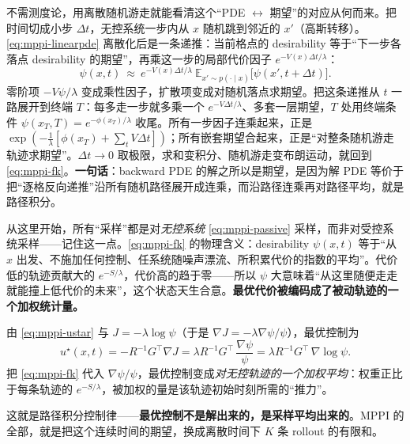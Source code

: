 \begin{derivation}
\label{der:mppi-fk}
不需测度论，用离散随机游走就能看清这个“PDE $\leftrightarrow$ 期望”的对应从何而来。把时间切成小步 $\Delta t$，无控系统一步内从 $x$ 随机跳到邻近的 $x'$（高斯转移）。\cref{eq:mppi-linearpde} 离散化后是一条递推：当前格点的 desirability 等于“下一步各落点 desirability 的期望”，再乘这一步的局部代价因子 $e^{-V(x)\Delta t/\lambda}$：
\begin{equation}
  \psi(x,t)\ \approx\ e^{-V(x)\Delta t/\lambda}\ \mathbb{E}_{x'\sim p(\cdot\mid x)}\big[\psi(x',t+\Delta t)\big].
  \label{eq:mppi-fk-discrete}
\end{equation}
零阶项 $-V\psi/\lambda$ 变成乘性因子，扩散项变成对随机落点求期望。把这条递推从 $t$ 一路展开到终端 $T$：每多走一步就多乘一个 $e^{-V\Delta t/\lambda}$、多套一层期望，$T$ 处用终端条件 $\psi(x_T,T)=e^{-\phi(x_T)/\lambda}$ 收尾。所有一步因子连乘起来，正是 $\exp(-\frac1\lambda[\phi(x_T)+\sum_t V\Delta t])$；所有嵌套期望合起来，正是“对整条随机游走轨迹求期望”。$\Delta t\to0$ 取极限，求和变积分、随机游走变布朗运动，就回到 \cref{eq:mppi-fk}。\textbf{一句话}：backward PDE 的解之所以是期望，是因为解 PDE 等价于把“逐格反向递推”沿所有随机路径展开成连乘，而沿路径连乘再对路径平均，就是路径积分。
\end{derivation}

\noindent 从这里开始，所有“采样”都是对\emph{无控系统} \cref{eq:mppi-passive} 采样，而非对受控系统采样——记住这一点。\cref{eq:mppi-fk} 的物理含义：desirability $\psi(x,t)$ 等于“从 $x$ 出发、不施加任何控制、任系统随噪声漂流、所积累代价的指数的平均”。代价低的轨迹贡献大的 $e^{-S/\lambda}$，代价高的趋于零——所以 $\psi$ 大意味着“从这里随便走走就能撞上低代价的未来”，这个状态天生合意。\textbf{最优代价被编码成了被动轨迹的一个加权统计量。}

\begin{theorem}[路径积分控制律]\label{thm:mppi-control-law}
由 \cref{eq:mppi-ustar} 与 $J=-\lambda\log\psi$（于是 $\nabla J=-\lambda\nabla\psi/\psi$），最优控制为
\begin{equation}
  u^\star(x,t)=-R^{-1}G^\top\nabla J=\lambda R^{-1}G^\top\,\frac{\nabla\psi}{\psi}=\lambda R^{-1}G^\top\,\nabla\log\psi.
  \label{eq:mppi-pi-control}
\end{equation}
把 \cref{eq:mppi-fk} 代入 $\nabla\psi/\psi$，最优控制变成\emph{对无控轨迹的一个加权平均}：权重正比于每条轨迹的 $e^{-S/\lambda}$，被加权的量是该轨迹初始时刻所需的“推力”。
\end{theorem}

\noindent 这就是路径积分控制律——\textbf{最优控制不是解出来的，是采样平均出来的}。MPPI 的全部，就是把这个连续时间的期望，换成离散时间下 $K$ 条 rollout 的有限和。


